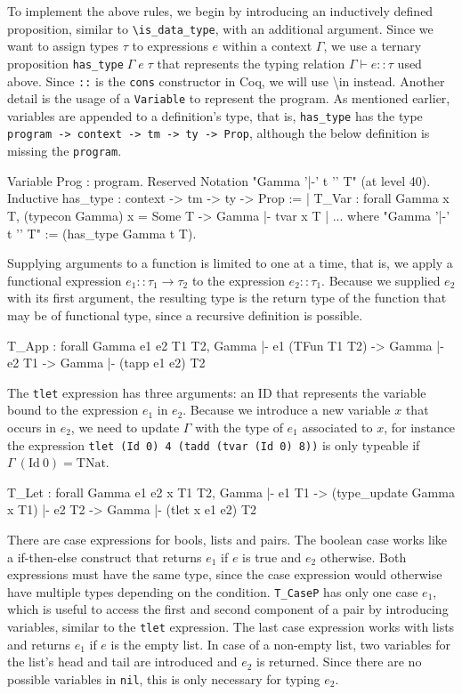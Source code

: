 \documentclass[paper = a4, fleqn, abstract=on, twoside]{scrreprt}
\newcommand{\coqinline}[1]{\texttt{#1}}
\begin{document}
\par
To implement the above rules, we begin by introducing an inductively defined proposition, similar to \texttt{\textbackslash is\_data\_type}, with an additional argument. Since we want to assign types $\tau$ to expressions $e$ within a context $\Gamma$, we use a ternary proposition \coqinline{has_type}$\; \Gamma \; e \; \tau$ that represents the typing relation $\Gamma \vdash e :: \tau$ used above. Since \coqinline{::} is the \coqinline{cons} constructor in Coq, we will use \textbackslash in instead. Another detail is the usage of a \coqinline{Variable} to represent the program. As mentioned earlier, variables are appended to a definition's type, that is, \coqinline{has_type} has the type \coqinline{program -> context -> tm -> ty -> Prop}, although the below definition is missing the \coqinline{program}.
\begin{coqcode}
Variable Prog : program.
Reserved Notation "Gamma '|-' t '\in' T" (at level 40).
Inductive has_type : context -> tm -> ty -> Prop :=
  | T_Var : forall Gamma x T, (typecon Gamma) x = Some T ->
              Gamma |- tvar x \in T
  | ...
where "Gamma '|-' t '\in' T" := (has_type Gamma t T).
\end{coqcode}
Supplying arguments to a function is limited to one at a time, that is, we apply a functional expression $e_{1} :: \tau_{1} \rightarrow \tau_{2}$ to the expression $e_{2} :: \tau_{1}$. Because we supplied $e_{2}$ with its first argument, the resulting type is the return type of the function that may be of functional type, since a recursive definition is possible.
\begin{coqcode}
T_App : forall Gamma e1 e2 T1 T2,
          Gamma |- e1 \in (TFun T1 T2) -> Gamma |- e2 \in T1 ->
          Gamma |- (tapp e1 e2) \in T2
\end{coqcode}
The \coqinline{tlet} expression has three arguments: an ID that represents the variable bound to the expression $e_{1}$ in $e_{2}$. Because we introduce a new variable $x$ that occurs in $e_{2}$, we need to update $\Gamma$ with the type of $e_{1}$ associated to $x$, for instance the expression \coqinline{tlet (Id 0) 4 (tadd (tvar (Id 0) 8))} is only typeable if $\Gamma \:(\text{Id}\: 0) = \text{TNat}$.
\begin{coqcode}
T_Let : forall Gamma e1 e2 x T1 T2,
          Gamma |- e1 \in T1 -> (type_update Gamma x T1) |- e2 \in T2 ->
          Gamma |- (tlet x e1 e2) \in T2
\end{coqcode}
There are case expressions for bools, lists and pairs. The boolean case works like a if-then-else construct that returns $e_{1}$ if $e$ is true and $e_{2}$ otherwise. Both expressions must have the same type, since the case expression would otherwise have multiple types depending on the condition. \coqinline{T_CaseP} has only one case $e_{1}$, which is useful to access the first and second component of a pair by introducing variables, similar to the \coqinline{tlet} expression. The last case expression works with lists and returns $e_{1}$ if $e$ is the empty list. In case of a non-empty list, two variables for the list's head and tail are introduced and $e_{2}$ is returned. Since there are no possible variables in \coqinline{nil}, this is only necessary for typing $e_{2}$.
\end{document}
